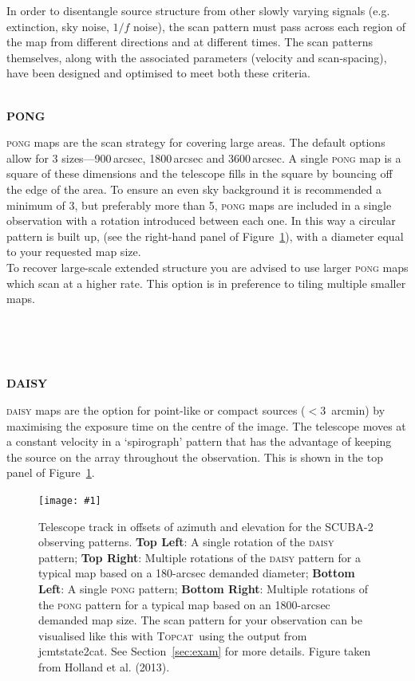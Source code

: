 \documentclass[twoside,11pt]{article}
\newcommand{\htmladdnormallink}[2]{#1}
\newcommand{\htmladdimg}[1]{}
\newcommand{\htmlref}[2]{#1}
\newcommand{\latexhtml}[2]{#1}
\newcommand{\xref}[3]{#1}
\renewcommand{\_}{\texttt{\symbol{95}}}
\newcommand{\topcat}{\htmladdnormallink{\textsc{Topcat}}{http://www.starlink.ac.uk/topcat}}
\newcommand{\task}[1]{\textsf{#1}}
\newcommand{\jcmtstate}{\xref{\task{jcmtstate2cat}}{sun258}{JCMTSTATE2CAT}}
\newcommand{\myfig}[6]{
  \begin{figure}#2
    \centering\texttt{[image: \#1]}
    \typeout{#1 inserted on page \arabic{page}}
    \caption[#5]{\label{#4}\small #6}
  \end{figure}
}
\newcommand{\myfig}[6]{
    \label{#4} \htmladdimg{#1.png}\\
    \\
    Figure: #6\\
  }
\newcommand{\cref}[3]{\latexhtml{#1~\ref{#2}}{\htmlref{#3}{#2}}}
\begin{document}
In order to disentangle source structure from other
slowly varying signals (e.g. extinction, sky noise, $1/f$ noise), the
scan pattern must pass across each region of the map from different
directions and at different times. The scan patterns themselves, along
with the associated parameters (velocity and scan-spacing), have been
designed and optimised to meet both these criteria.
\\ \\
\begin{minipage}[t]{0.12\linewidth}
\textbf{PONG}
\end{minipage}
\begin{minipage}[t]{0.85\linewidth}\textsc{pong} maps are the scan
strategy for covering large areas. The default options allow for 3
sizes---900\,arcsec, 1800\,arcsec and 3600\,arcsec. A single \textsc{pong} map is
a square of these dimensions and the telescope fills in the square by
bouncing off the edge of the area. To ensure an even sky background it
is recommended a minimum of 3, but preferably more than 5,
\textsc{pong} maps are included in a single observation with a
rotation introduced between each one. In this way a circular pattern
is built up, (see the right-hand panel of \cref{Figure}{fig:scan}{graphic below}),
with a diameter equal to your requested map size.
\vspace{0.2cm}\\
To recover large-scale extended structure you are advised to use
larger \textsc{pong} maps which scan at a higher rate. This option is
in preference to tiling multiple smaller maps.
\end{minipage}
\\ \\ \\
\begin{minipage}[t]{0.12\linewidth}
\textbf{DAISY}
\end{minipage}
\begin{minipage}[t]{0.85\linewidth}
\textsc{daisy} maps are the option for point-like or compact sources
($<$3~arcmin) by maximising the exposure time on the centre of the
image. The telescope moves at a constant velocity in a `spirograph'
pattern that has the advantage of keeping the source on the array
throughout the observation. This is shown in the top panel of
\cref{Figure}{fig:scan}{the figure below}.
\end{minipage}

\myfig{sc21_wayne_scan}{[b!]}{width=0.9\linewidth}{fig:scan}{
  Illustration of the SCUBA-2 observing patterns}{
  Telescope track in offsets of azimuth and elevation for the SCUBA-2
  observing patterns. \textbf{Top Left}: A single rotation of the
  \textsc{daisy} pattern; \textbf{Top Right}: Multiple rotations of
  the \textsc{daisy} pattern for a typical map based on a 180-arcsec
  demanded diameter; \textbf{Bottom Left}: A single \textsc{pong}
  pattern; \textbf{Bottom Right}: Multiple rotations of the
  \textsc{pong} pattern for a typical map based on an 1800-arcsec
  demanded map size. The scan pattern for your observation can be
  visualised like this with \topcat\ using the output from \jcmtstate.
  See \cref{Section}{sec:exam}{Examining raw data} for more details.
  Figure taken from Holland et al. (2013).}
\end{document}
